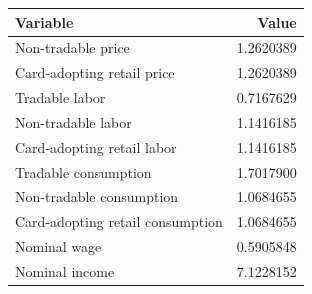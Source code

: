 \begin{table}
\centering
\begin{tabular}[t]{lr}
\toprule
Variable & Value\\
\midrule
Non-tradable price & 1.2620389\\
Card-adopting retail price & 1.2620389\\
Tradable labor & 0.7167629\\
Non-tradable labor & 1.1416185\\
Card-adopting retail labor & 1.1416185\\
\addlinespace
Tradable consumption & 1.7017900\\
Non-tradable consumption & 1.0684655\\
Card-adopting retail consumption & 1.0684655\\
Nominal wage & 0.5905848\\
Nominal income & 7.1228152\\
\bottomrule
\end{tabular}
\end{table}
